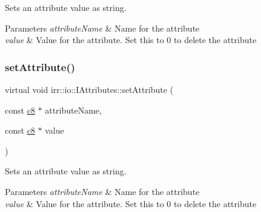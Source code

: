 Sets an attribute value as string. 


\begin{DoxyParams}{Parameters}
{\em attribute\+Name} & Name for the attribute \\
\hline
{\em value} & Value for the attribute. Set this to 0 to delete the attribute \\
\hline
\end{DoxyParams}
\mbox{\label{classirr_1_1io_1_1IAttributes_a9ff2fbcb3861c59159661aaebc84cb27}} 
\subsubsection{\texorpdfstring{set\+Attribute()}{setAttribute()}\hspace{0.1cm}{\footnotesize\ttfamily [2/10]}}
{\footnotesize\ttfamily virtual void irr\+::io\+::\+I\+Attributes\+::set\+Attribute (\begin{DoxyParamCaption}\item[{const \hyperlink{namespaceirr_a9395eaea339bcb546b319e9c96bf7410}{c8} $\ast$}]{attribute\+Name,  }\item[{const \hyperlink{namespaceirr_a9395eaea339bcb546b319e9c96bf7410}{c8} $\ast$}]{value }\end{DoxyParamCaption})\hspace{0.3cm}{\ttfamily [pure virtual]}}



Sets an attribute value as string. 


\begin{DoxyParams}{Parameters}
{\em attribute\+Name} & Name for the attribute \\
\hline
{\em value} & Value for the attribute. Set this to 0 to delete the attribute \\
\hline
\end{DoxyParams}
\mbox{\label{classirr_1_1io_1_1IAttributes_a0d270e61c06e6553857f90946fe177f7}} 
